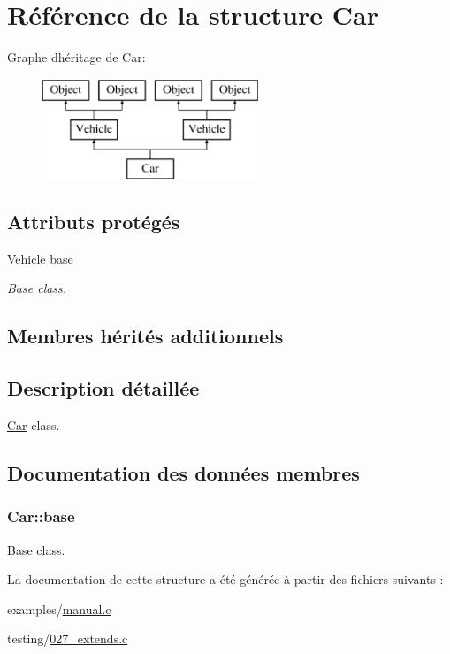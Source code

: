 \hypertarget{struct_car}{}\section{Référence de la structure Car}
\label{struct_car}
Graphe d\textquotesingle{}héritage de Car\+:\begin{figure}[H]
\begin{center}
\leavevmode
\includegraphics[height=3.000000cm]{struct_car}
\end{center}
\end{figure}
\subsection*{Attributs protégés}
\begin{DoxyCompactItemize}
\item 
\hyperlink{struct_vehicle}{Vehicle} \hyperlink{struct_car_ab8ff28306286da5a8b14fa9bdccaafaa}{base}
\begin{DoxyCompactList}\small\item\em Base class. \end{DoxyCompactList}\end{DoxyCompactItemize}
\subsection*{Membres hérités additionnels}


\subsection{Description détaillée}
\hyperlink{struct_car}{Car} class. 

\subsection{Documentation des données membres}
\hypertarget{struct_car_ab8ff28306286da5a8b14fa9bdccaafaa}{}
\subsubsection[{base}]{ Car\+::base\hspace{0.3cm}{\ttfamily [protected]}}\label{struct_car_ab8ff28306286da5a8b14fa9bdccaafaa}


Base class. 



La documentation de cette structure a été générée à partir des fichiers suivants \+:\begin{DoxyCompactItemize}
\item 
examples/\hyperlink{manual_8c}{manual.\+c}\item 
testing/\hyperlink{027__extends_8c}{027\+\_\+extends.\+c}\end{DoxyCompactItemize}
